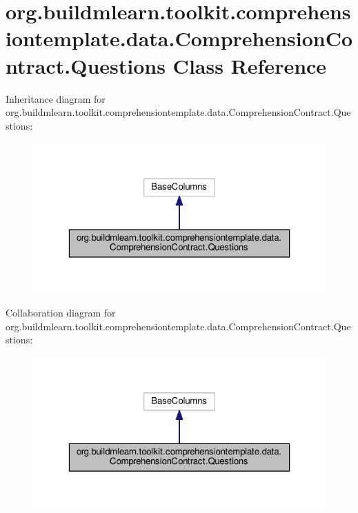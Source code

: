 \hypertarget{classorg_1_1buildmlearn_1_1toolkit_1_1comprehensiontemplate_1_1data_1_1ComprehensionContract_1_1Questions}{}\section{org.\+buildmlearn.\+toolkit.\+comprehensiontemplate.\+data.\+Comprehension\+Contract.\+Questions Class Reference}
\label{classorg_1_1buildmlearn_1_1toolkit_1_1comprehensiontemplate_1_1data_1_1ComprehensionContract_1_1Questions}


Inheritance diagram for org.\+buildmlearn.\+toolkit.\+comprehensiontemplate.\+data.\+Comprehension\+Contract.\+Questions\+:
\nopagebreak
\begin{figure}[H]
\begin{center}
\leavevmode
\includegraphics[width=323pt]{classorg_1_1buildmlearn_1_1toolkit_1_1comprehensiontemplate_1_1data_1_1ComprehensionContract_1_1Questions__inherit__graph}
\end{center}
\end{figure}


Collaboration diagram for org.\+buildmlearn.\+toolkit.\+comprehensiontemplate.\+data.\+Comprehension\+Contract.\+Questions\+:
\nopagebreak
\begin{figure}[H]
\begin{center}
\leavevmode
\includegraphics[width=323pt]{classorg_1_1buildmlearn_1_1toolkit_1_1comprehensiontemplate_1_1data_1_1ComprehensionContract_1_1Questions__coll__graph}
\end{center}
\end{figure}
